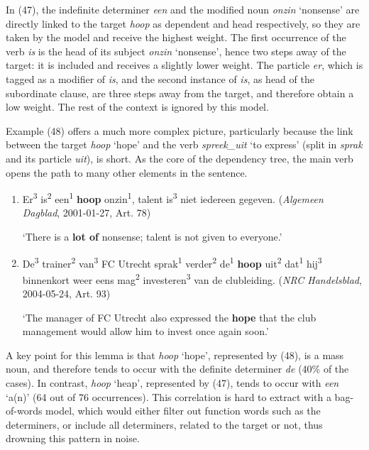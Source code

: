 \documentclass[
]{book}
\begin{document}
In (47), the indefinite determiner \emph{een} and the modified noun \emph{onzin} `nonsense' are directly linked to the target \emph{hoop} as dependent and head respectively, so they are taken by the model and receive the highest weight. The first occurrence of the verb \emph{is} is the head of its subject \emph{onzin} `nonsense', hence two steps away of the target: it is included and receives a slightly lower weight. The particle \emph{er}, which is tagged as a modifier of \emph{is}, and the second instance of \emph{is}, as head of the subordinate clause, are three steps away from the target, and therefore obtain a low weight. The rest of the context is ignored by this model.

Example (48) offers a much more complex picture, particularly because the link between the target \emph{hoop} `hope' and the verb \emph{spreek\_uit} `to express' (split in \emph{sprak} and its particle \emph{uit}), is short. As the core of the dependency tree, the main verb opens the path to many other elements in the sentence.

\begin{enumerate}
\def\labelenumi{(\arabic{enumi})}
\setcounter{enumi}{46}
\item
  Er\textsuperscript{3} is\textsuperscript{2} een\textsuperscript{1} \textbf{hoop} onzin\textsuperscript{1}, talent is\textsuperscript{3} niet iedereen gegeven. (\emph{Algemeen Dagblad}, 2001-01-27, Art. 78)

  `There is a \textbf{lot of} nonsense; talent is not given to everyone.'
\item
  De\textsuperscript{3} trainer\textsuperscript{2} van\textsuperscript{3} FC Utrecht sprak\textsuperscript{1} verder\textsuperscript{2} de\textsuperscript{1} \textbf{hoop} uit\textsuperscript{2} dat\textsuperscript{1} hij\textsuperscript{3} binnenkort weer eens mag\textsuperscript{2} investeren\textsuperscript{3} van de clubleiding. (\emph{NRC Handelsblad}, 2004-05-24, Art. 93)

  `The manager of FC Utrecht also expressed the \textbf{hope} that the club management would allow him to invest once again soon.'
\end{enumerate}

A key point for this lemma is that \emph{hoop} `hope', represented by (48), is a mass noun, and therefore tends to occur with the definite determiner \emph{de} (40\% of the cases). In contrast, \emph{hoop} `heap', represented by (47), tends to occur with \emph{een} `a(n)' (64 out of 76 occurrences). This correlation is hard to extract with a bag-of-words model, which would either filter out function words such as the determiners, or include all determiners, related to the target or not, thus drowning this pattern in noise.
\end{document}
